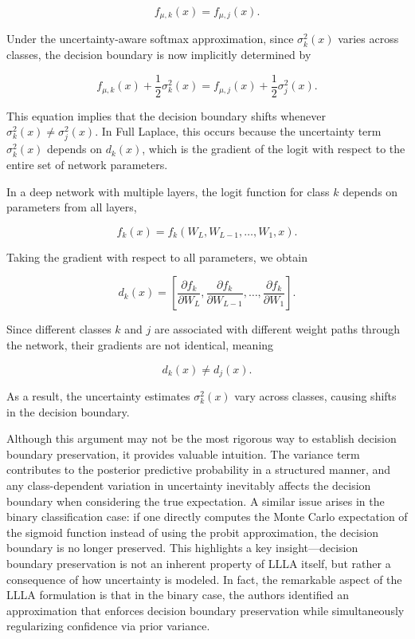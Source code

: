 \documentclass{article}
\begin{document}
\begin{equation}
    f_{\mu,k}(x) = f_{\mu,j}(x).
\end{equation}

Under the uncertainty-aware softmax approximation, since \( \sigma_k^2(x) \) varies across classes, the decision boundary is now implicitly determined by

\begin{equation}
    f_{\mu,k}(x) + \frac{1}{2} \sigma_k^2(x) = f_{\mu,j}(x) + \frac{1}{2} \sigma_j^2(x).
\end{equation}

This equation implies that the decision boundary shifts whenever \( \sigma_k^2(x) \neq \sigma_j^2(x) \). In Full Laplace, this occurs because the uncertainty term \( \sigma_k^2(x) \) depends on \( d_k(x) \), which is the gradient of the logit with respect to the entire set of network parameters. 

In a deep network with multiple layers, the logit function for class \( k \) depends on parameters from all layers,

\begin{equation}
    f_k(x) = f_k(W_L, W_{L-1}, \dots, W_1, x).
\end{equation}

Taking the gradient with respect to all parameters, we obtain

\begin{equation}
    d_k(x) = \left[ \frac{\partial f_k}{\partial W_L}, \frac{\partial f_k}{\partial W_{L-1}}, \dots, \frac{\partial f_k}{\partial W_1} \right].
\end{equation}

Since different classes \( k \) and \( j \) are associated with different weight paths through the network, their gradients are not identical, meaning

\begin{equation}
    d_k(x) \neq d_j(x).
\end{equation}

As a result, the uncertainty estimates \( \sigma_k^2(x) \) vary across classes, causing shifts in the decision boundary.

Although this argument may not be the most rigorous way to establish decision boundary preservation, it provides valuable intuition. The variance term contributes to the posterior predictive probability in a structured manner, and any class-dependent variation in uncertainty inevitably affects the decision boundary when considering the true expectation. A similar issue arises in the binary classification case: if one directly computes the Monte Carlo expectation of the sigmoid function instead of using the probit approximation, the decision boundary is no longer preserved. This highlights a key insight—decision boundary preservation is not an inherent property of LLLA itself, but rather a consequence of how uncertainty is modeled. In fact, the remarkable aspect of the LLLA formulation is that in the binary case, the authors identified an approximation that enforces decision boundary preservation while simultaneously regularizing confidence via prior variance.
\end{document}
